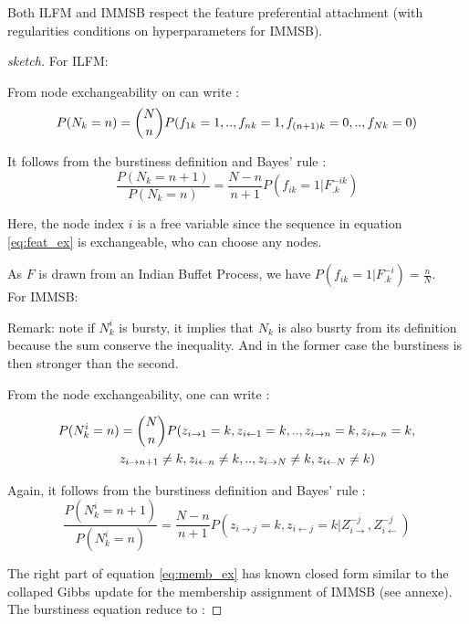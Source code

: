 \documentclass{llncs}
\begin{document}
\begin{proposition}
Both ILFM and IMMSB respect the feature preferential attachment (with regularities conditions on hyperparameters for IMMSB).	
\end{proposition}

\begin{proof}[sketch]
	
For ILFM:

From node exchangeability on can write :
\begin{equation} \label{eq:feat_ex}
P(N_k=n) = \dbinom{N}{n}P(f_{1k}=1,..,f_{nk}=1,f_{(n+1)k}=0,..,f_{Nk}=0)
\end{equation}

It follows from the burstiness definition and Bayes' rule :
\begin{equation}
\frac{P(N_k=n+1)}{P(N_k=n)} = \frac{N-n}{n+1}P(f_{ik}=1 | F_{.k}^{-ik})
\end{equation} 

Here, the node index $i$ is a free variable since the sequence in equation \eqref{eq:feat_ex} is exchangeable, who can choose any nodes.

As $F$ is drawn from an Indian Buffet Process, we have $P(f_{ik}=1 | F_{.k}^{-i}) = \frac{n}{N}$.\\


For IMMSB: 

Remark: note if $N_k^i$ is bursty, it implies that $N_k$ is also busrty from its definition because the sum conserve the inequality. And in the former case the burstiness is then stronger than the second.

From the node exchangeability, one can write :

\begin{align*}
P(N_k^i=n) &= \dbinom{N}{n}P(z_{i\rightarrow 1}=k,z_{i\leftarrow 1}=k,..,z_{i\rightarrow n}=k, z_{i\leftarrow n}=k, \\
 &z_{i\rightarrow n+1}\neq k, z_{i\leftarrow n}\neq k,..,  z_{i\rightarrow N}\neq k, z_{i\leftarrow N}\neq k)
\end{align*}

Again, it follows from the burstiness definition and Bayes' rule :
\begin{equation} \label{eq:memb_ex}
\frac{P(N_k^i=n+1)}{P(N_k^i=n)} = \frac{N-n}{n+1}P(z_{i\rightarrow j}=k,z_{i\leftarrow j}=k | Z_{i\rightarrow}^{-j}, Z_{i\leftarrow}^{-j})	
\end{equation}

The right part of equation \eqref{eq:memb_ex} has known closed form similar to the collaped Gibbs update for the membership assignment of IMMSB (see annexe). The burstiness equation reduce to :


\end{proof}
\end{document}
